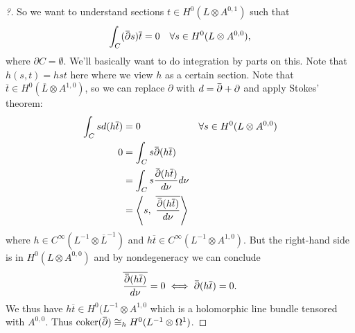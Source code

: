 \begin{proof}[?]
So we want to understand sections \(t\in H^0(L\otimes A^{0, 1})\) such
that
\begin{align*}
\int_C (\mkern 1.5mu\overline{\mkern-1.5mu{\partial}\mkern-1.5mu}\mkern 1.5mus){\overline{{t}}} = 0 && \forall s\in H^0(L\otimes A^{0, 0})
,\end{align*}
where \({{\partial}}C = \emptyset\). We'll basically want to do
integration by parts on this. Note that \(h(s, t) = hst\) here where we
view \(h\) as a certain section. Note that
\({\overline{{t}}} \in H^0({\overline{{L}}} \otimes A^{1, 0})\), so we
can replace \({\partial}\) with
\(d = \mkern 1.5mu\overline{\mkern-1.5mu{\partial}\mkern-1.5mu}\mkern 1.5mu+ {\partial}\)
and apply Stokes' theorem:
\begin{align*}
\int_C s d(h {\overline{{t}}}) &= 0 && \forall s\in H^0(L\otimes A^{0, 0}) \\
0 
&= \int_C s\mkern 1.5mu\overline{\mkern-1.5mu{\partial}\mkern-1.5mu}\mkern 1.5mu(h {\overline{{t}}}) \\
&= \int_C s {\mkern 1.5mu\overline{\mkern-1.5mu{\partial}\mkern-1.5mu}\mkern 1.5mu(h {\overline{{t}}}) \over d\nu}d\nu\\
&= {\left\langle {s},~{{\overline{{\mkern 1.5mu\overline{\mkern-1.5mu{\partial}\mkern-1.5mu}\mkern 1.5mu(h {\overline{{t}}}) \over d\nu }}}} \right\rangle}
\end{align*}
where \(h \in C^{\infty }(L ^{-1} \otimes{\overline{{L}}}^{-1})\) and
\(h{\overline{{t}}} \in C^{\infty }(L^{-1}\otimes A^{1, 0})\). But the
right-hand side is in \(H^0(L \otimes A^{0, 0} )\) and by nondegeneracy
we can conclude
\begin{align*}
{\overline{{\mkern 1.5mu\overline{\mkern-1.5mu{\partial}\mkern-1.5mu}\mkern 1.5mu(h {\overline{{t}}}) \over d\nu }}} = 0
\iff \mkern 1.5mu\overline{\mkern-1.5mu{\partial}\mkern-1.5mu}\mkern 1.5mu(h{\overline{{t}}}) = 0
.\end{align*}
We thus have \(h{\overline{{t}}} \in H^0( L ^{-1}\otimes A^{1, 0}\)
which is a holomorphic line bundle tensored with \(A^{0, 0}\). Thus
\(\operatorname{coker}(\mkern 1.5mu\overline{\mkern-1.5mu{\partial}\mkern-1.5mu}\mkern 1.5mu) \cong_h H^0( L ^{-1} \otimes\Omega^1)\).

\end{proof}

